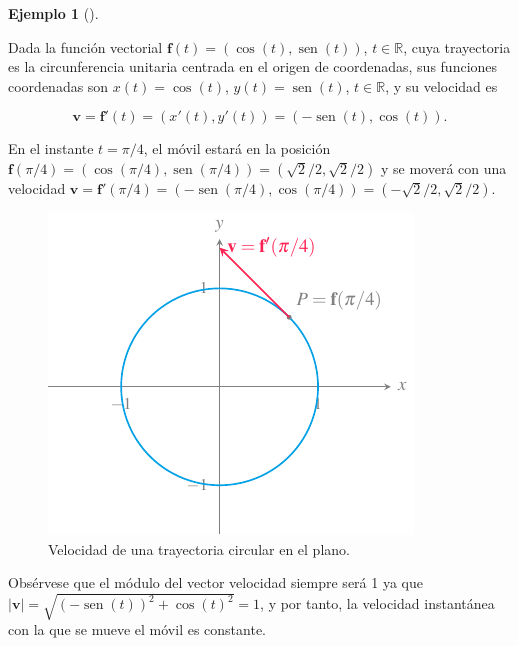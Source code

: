 \documentclass[
  a4paper,
]{scrreport}
\theoremstyle{plain}
\theoremstyle{plain}
\theoremstyle{definition}
\theoremstyle{definition}
\newtheorem{example}{Ejemplo}[chapter]
\theoremstyle{plain}
\theoremstyle{remark}
\begin{document}
\begin{example}[]\protect\hypertarget{exm-movimiento-curvilineo-plano}{}\label{exm-movimiento-curvilineo-plano}

Dada la función vectorial
\(\mathbf{f}(t) = (\cos(t),\operatorname{sen}(t))\),
\(t\in \mathbb{R}\), cuya trayectoria es la circunferencia unitaria
centrada en el origen de coordenadas, sus funciones coordenadas son
\(x(t) = \cos(t)\), \(y(t) = \operatorname{sen}(t)\),
\(t\in \mathbb{R}\), y su velocidad es

\[
\mathbf{v} = \mathbf{f}'(t) = (x'(t),y'(t)) = (-\operatorname{sen}(t), \cos(t)).
\]

En el instante \(t=\pi/4\), el móvil estará en la posición
\(\mathbf{f}(\pi/4) = (\cos(\pi/4),\operatorname{sen}(\pi/4)) =(\sqrt{2}/2,\sqrt{2}/2)\)
y se moverá con una velocidad
\(\mathbf{v}=\mathbf{f}'(\pi/4)=(-\operatorname{sen}(\pi/4),\cos(\pi/4))=(-\sqrt{2}/2,\sqrt{2}/2)\).

\begin{figure}

{\centering \includegraphics{img/funciones-vectoriales/velocidad-trayectoria-circular.pdf}

}

\caption{Velocidad de una trayectoria circular en el plano.}

\end{figure}

Obsérvese que el módulo del vector velocidad siempre será 1 ya que
\(|\mathbf{v}|=\sqrt{(-\operatorname{sen}(t))^2+\cos(t)^2}=1\), y por
tanto, la velocidad instantánea con la que se mueve el móvil es
constante.

\end{example}
\end{document}
